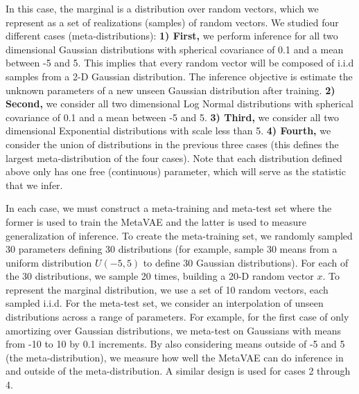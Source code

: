 In this case, the marginal is a distribution over random vectors, which we represent as a set of realizations (samples) of random vectors. We studied four different cases (meta-distributions): \textbf{1) First,} we perform inference for all two dimensional Gaussian distributions with spherical covariance of 0.1 and a mean between -5 and 5. This implies that every random vector will be composed of i.i.d samples from a 2-D Gaussian distribution. The inference objective is estimate the unknown parameters of a new unseen Gaussian distribution after training. \textbf{2) Second,} we consider all two dimensional Log Normal distributions with spherical covariance of 0.1 and a mean between -5 and 5. \textbf{3) Third,} we consider all two dimensional Exponential distributions with scale less than 5. \textbf{4) Fourth,} we consider the union of distributions in the previous three cases (this defines the largest meta-distribution of the four cases). Note that each distribution defined above only has one free (continuous) parameter, which will serve as the statistic that we infer.

In each case, we must construct a meta-training and meta-test set where the former is used to train the MetaVAE and the latter is used to measure generalization of inference. To create the meta-training set, we randomly sampled 30 parameters defining 30 distributions (for example, sample 30 means from a uniform distribution $U(-5, 5)$ to define 30 Gaussian distributions). For each of the 30 distributions, we sample 20 times, building a 20-D random vector $x$. To represent the marginal distribution, we use a set of 10 random vectors, each sampled  i.i.d. For the meta-test set, we consider an interpolation of unseen distributions across a range of parameters. For example, for the first case of only amortizing over Gaussian distributions, we meta-test on Gaussians with means from -10 to 10 by 0.1 increments. By also considering means outside of -5 and 5 (the meta-distribution), we measure how well the MetaVAE can do inference in and outside of the meta-distribution. A similar design is used for cases 2 through 4. 

